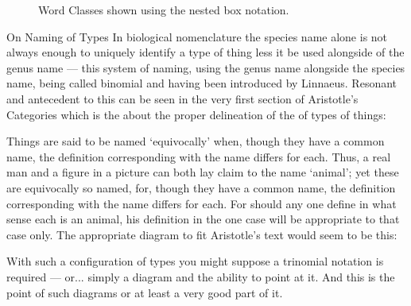\begin{figure}
\begin{center}

\end{center}
\caption{Word Classes shown using the nested box notation.}
\label{wordclassesnested}
 \end{figure}
On Naming of Types
In biological nomenclature the species name alone is not always enough to uniquely identify a type of thing less it be used alongside of the genus name — this system of naming, using the genus name alongside the species name, being called binomial and having been introduced by Linnaeus. Resonant and antecedent to this can be seen in the very first section of Aristotle's Categories which is the about the proper delineation of the of types of things:

Things are said to be named ‘equivocally’ when, though they have a common name, the definition corresponding with the name differs for each. Thus, a real man and a figure in a picture can both lay claim to the name ‘animal’; yet these are equivocally so named, for, though they have a common name, the definition corresponding with the name differs for each. For should any one define in what sense each is an animal, his definition in the one case will be appropriate to that case only.
The appropriate diagram to fit Aristotle's text would seem to be this:
\begin{center}

\end{center}

With such a configuration of types you might suppose a trinomial notation is required — or... simply a diagram and the ability to point at it. And this is the point of such diagrams or at least a very good part of it.